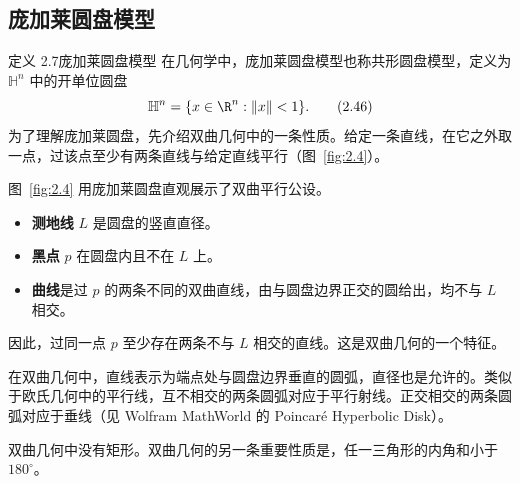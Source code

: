 \subsection{庞加莱圆盘模型}
\begin{statement}{定义 2.7}{庞加莱圆盘模型}
在几何学中，庞加莱圆盘模型也称共形圆盘模型，定义为 $\mathbb H^n$ 中的开单位圆盘
\begin{equation*}
  \mathbb H^n=\{x\in\R^n:\lVert x\rVert<1\}.
  \tag{2.46}\label{eq:2.46}
\end{equation*}
为了理解庞加莱圆盘，先介绍双曲几何中的一条性质。给定一条直线，在它之外取一点，过该点至少有两条直线与给定直线平行（图~\ref{fig:2.4}）。

图~\ref{fig:2.4} 用庞加莱圆盘直观展示了双曲平行公设。
\begin{itemize}
  \item \textbf{测地线} $L$ 是圆盘的竖直直径。
  \item \textbf{黑点} $p$ 在圆盘内且不在 $L$ 上。
  \item \textbf{曲线}是过 $p$ 的两条不同的双曲直线，由与圆盘边界正交的圆给出，均不与 $L$ 相交。
\end{itemize}
\begin{figure}[htbp]
  \centering
  
\end{figure}

因此，过同一点 $p$ 至少存在两条不与 $L$ 相交的直线。这是双曲几何的一个特征。

在双曲几何中，直线表示为端点处与圆盘边界垂直的圆弧，直径也是允许的。类似于欧氏几何中的平行线，互不相交的两条圆弧对应于平行射线。正交相交的两条圆弧对应于垂线（见 Wolfram MathWorld 的 Poincaré Hyperbolic Disk）。

双曲几何中没有矩形。双曲几何的另一条重要性质是，任一三角形的内角和小于 $180^\circ$。
\end{statement}

